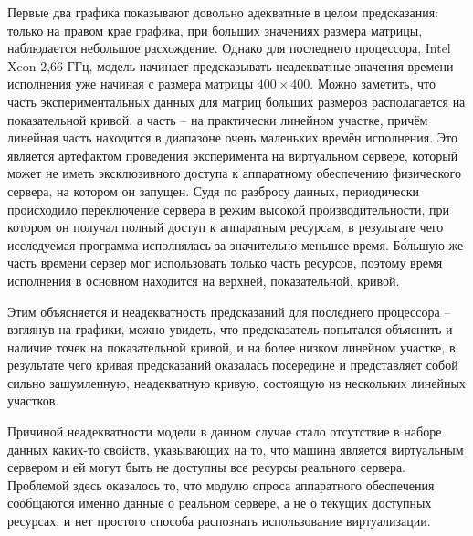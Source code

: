Первые два графика показывают довольно адекватные в целом предсказания: только на правом крае графика, при больших значениях размера матрицы, наблюдается небольшое расхождение. Однако для последнего процессора, Intel Xeon 2,66 ГГц, модель начинает предсказывать неадекватные значения времени исполнения уже начиная с размера матрицы $400 \times 400$. Можно заметить, что часть экспериментальных данных для матриц больших размеров располагается на показательной кривой, а часть -- на практически линейном участке, причём линейная часть находится в диапазоне очень маленьких времён исполнения. Это является артефактом проведения эксперимента на виртуальном сервере, который может не иметь эксклюзивного доступа к аппаратному обеспечению физического сервера, на котором он запущен. Судя по разбросу данных, периодически происходило переключение сервера в режим высокой производительности, при котором он получал полный доступ к аппаратным ресурсам, в результате чего исследуемая программа исполнялась за значительно меньшее время. Б\'{о}льшую же часть времени сервер мог использовать только часть ресурсов, поэтому время исполнения в основном находится на верхней, показательной, кривой.

Этим объясняется и неадекватность предсказаний для последнего процессора -- взглянув на графики, можно увидеть, что предсказатель попытался объяснить и наличие точек на показательной кривой, и на более низком линейном участке, в результате чего кривая предсказаний оказалась посередине и представляет собой сильно зашумленную, неадекватную кривую, состоящую из нескольких линейных участков.

Причиной неадекватности модели в данном случае стало отсутствие в наборе данных каких-то свойств, указывающих на то, что машина является виртуальным сервером и ей могут быть не доступны все ресурсы реального сервера. Проблемой здесь оказалось то, что модулю опроса аппаратного обеспечения сообщаются именно данные о реальном сервере, а не о текущих доступных ресурсах, и нет простого способа распознать использование виртуализации.